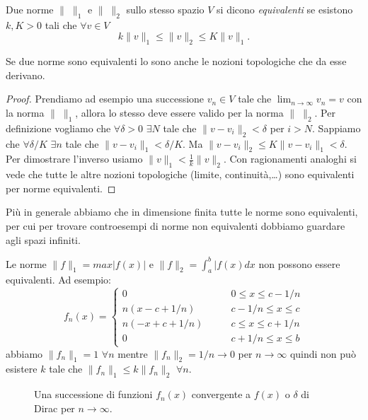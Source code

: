 \begin{definition}
Due norme $\|\;\|_1$ e $\|\;\|_2$ sullo stesso spazio $V$ si dicono \emph{equivalenti}
se esistono $k, K > 0$ tali che $\forall v \in V$ 
\[
	k\|v\|_1\leq \|v\|_2\leq K\|v\|_1
.\]
\end{definition}

\begin{lemma}
Se due norme sono equivalenti lo sono anche le nozioni topologiche che da
esse derivano.
\end{lemma}
\begin{proof}
Prendiamo ad esempio una successione $v_n\in V$ tale che
$\lim_{n\to \infty}v_n=v$ con la norma $\|\;\|_1$, allora lo stesso deve
essere valido per la norma $\|\;\|_2$. Per definizione vogliamo che
$\forall \delta>0$ $\exists N$ tale che $\|v-v_i\|_2<\delta$ per $i>N$.
Sappiamo che $\forall \delta/K$ $\exists n$ tale che $\|v-v_i\|_1<\delta/K$.
Ma $\|v-v_i\|_2\leq K\|v-v_i\|_1<\delta$. Per dimostrare l'inverso usiamo
$\|v\|_1<\frac{1}{k}\|v\|_2$.
Con ragionamenti analoghi si vede che tutte le altre nozioni topologiche
(limite, continuità,\ldots) sono equivalenti per norme equivalenti.
\end{proof}
Più in generale abbiamo che in dimensione finita tutte le norme sono
equivalenti, per cui per trovare controesempi di norme non equivalenti
dobbiamo guardare agli spazi infiniti.
\begin{example}
	
Le norme $\|f\|_1=max|f(x)|$ e $\|f\|_2=\int_{a}^b|f(x)dx$ non possono essere
equivalenti. Ad esempio:
\[
f_n(x)=\begin{cases}
0 \qquad &0 \leq x \leq c - 1/n\\
n(x-c+1/n) \qquad &c - 1/n \leq x \leq c\\
n(-x+c+1/n)\qquad &c \leq x \leq c + 1/n\\
0\qquad &c + 1/n \leq x \leq b
\end{cases}
\]
abbiamo $\|f_n\|_1=1$ $\forall n$ mentre $\|f_n\|_2=1/n\to 0$ per
$n\to \infty$ quindi non può esistere $k$ tale che
$\|f_n\|_1\leq k \|f_n\|_2$ $\forall n$.
\begin{figure}[!htb]
	\centering 
		\def\svgwidth{\columnwidth}
		\resizebox{10cm}{6cm}{}
	\caption{Una successione di funzioni $f_n(x)$ convergente a $f(x)$
	o $\delta$ di Dirac per $n \to \infty$.
	\label{2nrm_dicdelta}}
\end{figure}
\end{example}

